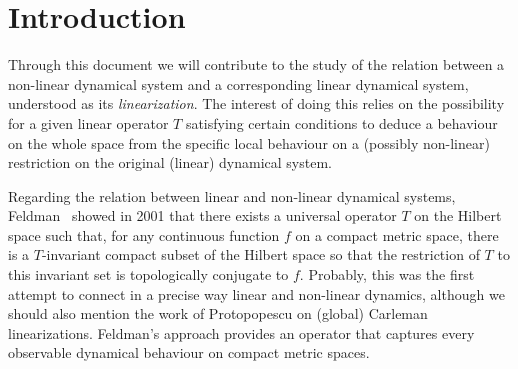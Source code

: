 \documentclass[12pt,english]{amsart}
\numberwithin{equation}{section}
\theoremstyle{plain}
\theoremstyle{definition}
\begin{document}
\tableofcontents



\section{Introduction}\label{intro}

Through this document we will contribute to the study of the relation between a non-linear dynamical system and a corresponding linear dynamical system, understood as its \textit{linearization}. The interest of doing this relies on the possibility for a given linear operator $T$ satisfying certain conditions to deduce a behaviour on the whole space from the specific local behaviour on a (possibly non-linear) restriction on the original (linear) dynamical system.

Regarding the relation between linear and non-linear dynamical systems, Feldman~\cite{Feldman01} showed in 2001 that there exists a universal operator $T$ on the Hilbert space such that, for any continuous function $f$ on a compact metric space, there is a $T$-invariant compact subset of the Hilbert space so that the restriction of $T$ to this invariant set is topologically conjugate to $f$. Probably, this was the first attempt to connect in a precise way linear and non-linear dynamics, although we should also mention the work of Protopopescu \cite{Prot90} on (global) Carleman linearizations. Feldman's approach provides an operator that captures every observable dynamical behaviour on compact metric spaces. 
\end{document}
